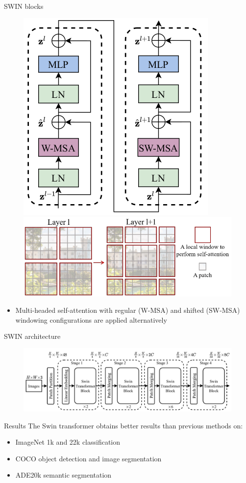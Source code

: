 \documentclass[xcolor=pdftex,dvipsnames,table,mathserif]{beamer}
\begin{document}
\begin{frame}{SWIN blocks}

\begin{figure}[ht]
  \centering
  \includegraphics[width=.25\textwidth]{swin_blocks}
   \includegraphics[width=.5\textwidth]{swin_windows}
\end{figure}

\begin{itemize}
\item Multi-headed self-attention with regular (W-MSA) and shifted  (SW-MSA) windowing configurations are applied alternatively
\end{itemize}

\end{frame}

\begin{frame}{SWIN architecture }

\begin{figure}[ht]
  \centering
  \includegraphics[width=\textwidth]{swin_archi}
\end{figure}

\begin{block}{Results}
  The Swin transformer obtains better results than previous methods on:

  \begin{itemize}
  \item ImageNet 1k and 22k classification
  \item COCO object detection and image segmentation
  \item ADE20k semantic segmentation
  \end{itemize}
\end{block}


\end{frame}
\end{document}
